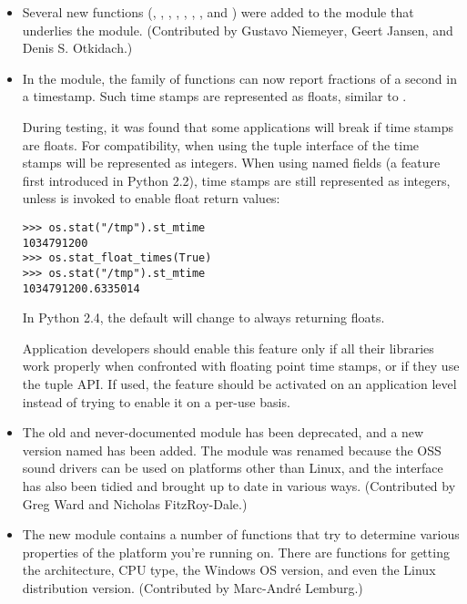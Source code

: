 \documentclass{howto}
\begin{document}
\begin{itemize}
\item Several new functions (, ,
, , , ,
, and ) were added to the
 module that underlies the  module.
(Contributed by Gustavo Niemeyer, Geert Jansen, and Denis S. Otkidach.)

\item In the  module, the  family of functions can now report
fractions of a second in a timestamp.  Such time stamps are
represented as floats, similar to .

During testing, it was found that some applications will break if time
stamps are floats.  For compatibility, when using the tuple interface
of the  time stamps will be represented as integers.
When using named fields (a feature first introduced in Python 2.2),
time stamps are still represented as integers, unless
 is invoked to enable float return
values:

\begin{verbatim}
>>> os.stat("/tmp").st_mtime
1034791200
>>> os.stat_float_times(True)
>>> os.stat("/tmp").st_mtime
1034791200.6335014
\end{verbatim}

In Python 2.4, the default will change to always returning floats.

Application developers should enable this feature only if all their
libraries work properly when confronted with floating point time
stamps, or if they use the tuple API. If used, the feature should be
activated on an application level instead of trying to enable it on a
per-use basis.

\item The old and never-documented  module has
been deprecated, and a new version named  has been
added.  The module was renamed because the OSS sound drivers can be
used on platforms other than Linux, and the interface has also been
tidied and brought up to date in various ways. (Contributed by Greg
Ward and Nicholas FitzRoy-Dale.)

\item The new  module contains a number of functions
that try to determine various properties of the platform you're
running on.  There are functions for getting the architecture, CPU
type, the Windows OS version, and even  the Linux distribution version.
(Contributed by Marc-Andr\'e Lemburg.)


\end{itemize}
\end{document}
